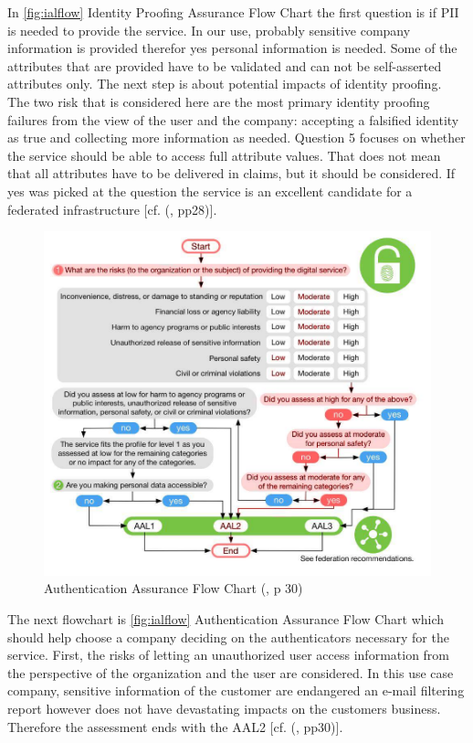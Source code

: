In \ref{fig:ialflow} Identity Proofing Assurance Flow Chart the first question is if PII is needed to provide the service. In our use, probably sensitive company information is provided therefor yes personal information is needed. Some of the attributes that are provided have to be validated and can not be self-asserted attributes only. The next step is about potential impacts of identity proofing. The two risk that is considered here are the most primary identity proofing failures from the view of the user and the company: accepting a falsified identity as true and collecting more information as needed. Question 5 focuses on whether the service should be able to access full attribute values. That does not mean that all attributes have to be delivered in claims, but it should be considered. If yes was picked at the question the service is an excellent candidate for a federated infrastructure [cf. (\cite{NIST:2017:DIG}, pp28)]. 

\begin{figure}[h]
	\centering
	\includegraphics[width=0.9\linewidth]{images/aal_flow}
	\caption{Authentication Assurance Flow Chart (\cite{NIST:2017:DIG}, p 30)}
	\label{fig:aalflow}
\end{figure}

The next flowchart is \ref{fig:ialflow} Authentication Assurance Flow Chart which should help choose a company deciding on the authenticators necessary for the service. First, the risks of letting an unauthorized user access information from the perspective of the organization and the user are considered. In this use case company, sensitive information of the customer are endangered an e-mail filtering report however does not have devastating impacts on the customers business. Therefore the assessment ends with the AAL2 [cf. (\cite{NIST:2017:DIG}, pp30)].  

